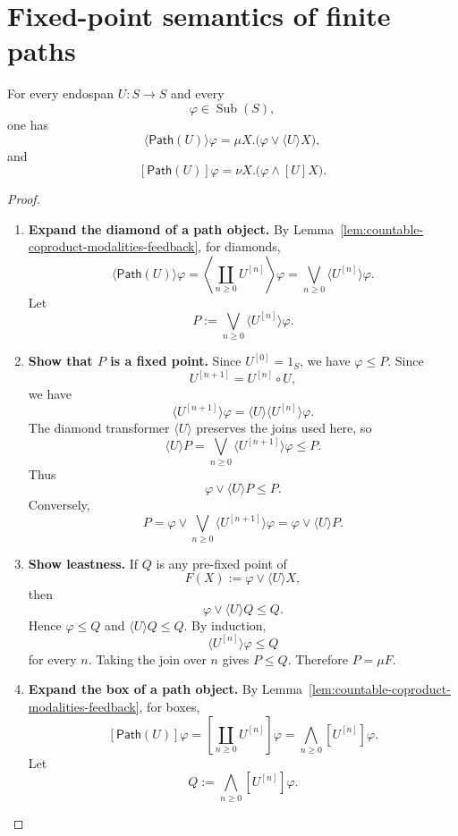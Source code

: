 \section{Fixed-point semantics of finite paths}
\label{sec:fixed-point-semantics-path}

\begin{theorem}
\label{thm:finite-path-fixed-point-semantics}
For every endospan \(U:S\to S\) and every
\[
  \varphi\in\operatorname{Sub}(S),
\]
one has
\[
  \langle\mathsf{Path}(U)\rangle\varphi
  =
  \mu X.\bigl(\varphi\vee\langle U\rangle X\bigr),
\]
and
\[
  [\mathsf{Path}(U)]\varphi
  =
  \nu X.\bigl(\varphi\wedge[U]X\bigr).
\]
\end{theorem}

\begin{proof}
\begin{enumerate}
  \item \textbf{Expand the diamond of a path object.}
  By Lemma~\ref{lem:countable-coproduct-modalities-feedback}, for diamonds,
  \[
    \langle\mathsf{Path}(U)\rangle\varphi
    =
    \left\langle\coprod_{n\geq 0}U^{[n]}\right\rangle\varphi
    =
    \bigvee_{n\geq 0}\langle U^{[n]}\rangle\varphi.
  \]
  Let
  \[
    P:=
    \bigvee_{n\geq 0}\langle U^{[n]}\rangle\varphi.
  \]

  \item \textbf{Show that \(P\) is a fixed point.}
  Since \(U^{[0]}=1_S\), we have \(\varphi\leq P\). Since
  \[
    U^{[n+1]}=U^{[n]}\circ U,
  \]
  we have
  \[
    \langle U^{[n+1]}\rangle\varphi
    =
    \langle U\rangle\langle U^{[n]}\rangle\varphi.
  \]
  The diamond transformer \(\langle U\rangle\) preserves the joins used here,
  so
  \[
    \langle U\rangle P
    =
    \bigvee_{n\geq 0}\langle U^{[n+1]}\rangle\varphi
    \leq P.
  \]
  Thus
  \[
    \varphi\vee\langle U\rangle P\leq P.
  \]
  Conversely,
  \[
    P
    =
    \varphi
    \vee
    \bigvee_{n\geq 0}\langle U^{[n+1]}\rangle\varphi
    =
    \varphi\vee\langle U\rangle P.
  \]

  \item \textbf{Show leastness.}
  If \(Q\) is any pre-fixed point of
  \[
    F(X):=\varphi\vee\langle U\rangle X,
  \]
  then
  \[
    \varphi\vee\langle U\rangle Q\leq Q.
  \]
  Hence \(\varphi\leq Q\) and \(\langle U\rangle Q\leq Q\). By induction,
  \[
    \langle U^{[n]}\rangle\varphi\leq Q
  \]
  for every \(n\). Taking the join over \(n\) gives \(P\leq Q\). Therefore
  \(P=\mu F\).

  \item \textbf{Expand the box of a path object.}
  By Lemma~\ref{lem:countable-coproduct-modalities-feedback}, for boxes,
  \[
    [\mathsf{Path}(U)]\varphi
    =
    \left[\coprod_{n\geq 0}U^{[n]}\right]\varphi
    =
    \bigwedge_{n\geq 0}[U^{[n]}]\varphi.
  \]
  Let
  \[
    Q:=
    \bigwedge_{n\geq 0}[U^{[n]}]\varphi.
  \]


\end{enumerate}
\end{proof}
